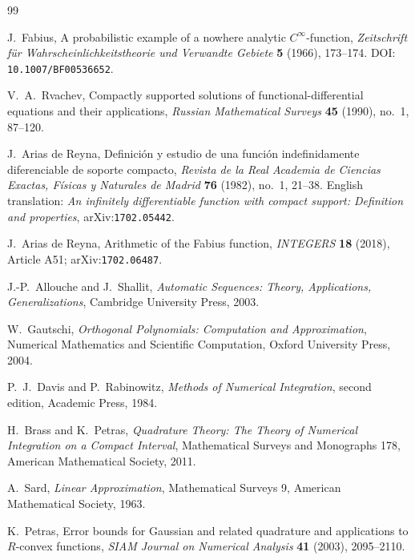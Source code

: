 \documentclass[11pt]{article}
\numberwithin{equation}{section}
\theoremstyle{definition}
\theoremstyle{remark}
\begin{document}
\begin{thebibliography}{99}

J.~Fabius,
\newblock A probabilistic example of a nowhere analytic $C^\infty$-function,
\newblock \emph{Zeitschrift f\"ur Wahrscheinlichkeitstheorie und Verwandte Gebiete}
\textbf{5} (1966), 173--174.
\newblock DOI: \nolinkurl{10.1007/BF00536652}.

V.~A.~Rvachev,
\newblock Compactly supported solutions of functional-differential equations and their applications,
\newblock \emph{Russian Mathematical Surveys} \textbf{45} (1990), no.~1, 87--120.

J.~Arias de Reyna,
\newblock Definici\'on y estudio de una funci\'on indefinidamente diferenciable de soporte compacto,
\newblock \emph{Revista de la Real Academia de Ciencias Exactas, F\'isicas y Naturales de Madrid}
\textbf{76} (1982), no.~1, 21--38.
\newblock English translation: \emph{An infinitely differentiable function with compact support: Definition and properties}, arXiv:\nolinkurl{1702.05442}.

J.~Arias de Reyna,
\newblock Arithmetic of the Fabius function,
\newblock \emph{INTEGERS} \textbf{18} (2018), Article A51;
 arXiv:\nolinkurl{1702.06487}.

J.-P.~Allouche and J.~Shallit,
\newblock \emph{Automatic Sequences: Theory, Applications, Generalizations},
\newblock Cambridge University Press, 2003.

W.~Gautschi,
\newblock \emph{Orthogonal Polynomials: Computation and Approximation},
\newblock Numerical Mathematics and Scientific Computation, Oxford University Press, 2004.

P.~J.~Davis and P.~Rabinowitz,
\newblock \emph{Methods of Numerical Integration}, second edition,
\newblock Academic Press, 1984.

H.~Brass and K.~Petras,
\newblock \emph{Quadrature Theory: The Theory of Numerical Integration on a Compact Interval},
\newblock Mathematical Surveys and Monographs 178, American Mathematical Society, 2011.

A.~Sard,
\newblock \emph{Linear Approximation},
\newblock Mathematical Surveys 9, American Mathematical Society, 1963.

K.~Petras,
\newblock Error bounds for Gaussian and related quadrature and applications to $R$-convex functions,
\newblock \emph{SIAM Journal on Numerical Analysis} \textbf{41} (2003), 2095--2110.


\end{thebibliography}
\end{document}
